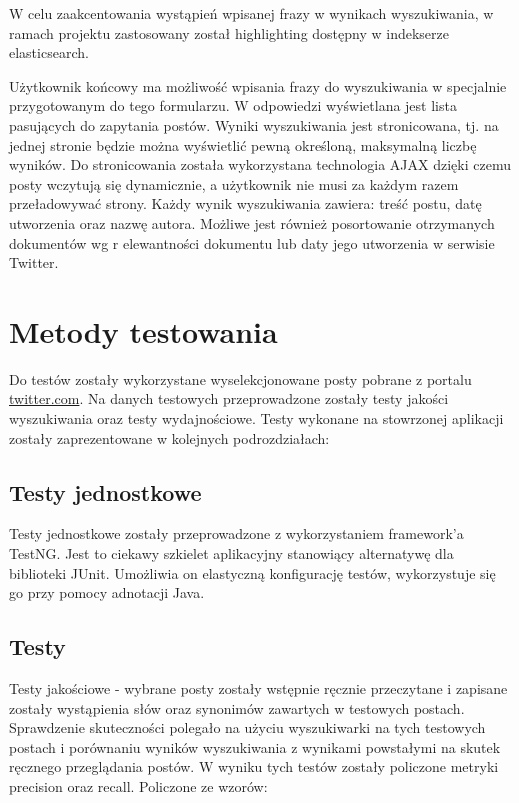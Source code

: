 \documentclass[runningheads]{llncs}
\begin{document}
W celu zaakcentowania wystąpień wpisanej frazy w wynikach wyszukiwania,  w
ramach projektu zastosowany został highlighting dostępny w indekserze
elasticsearch.

Użytkownik końcowy ma możliwość wpisania frazy do wyszukiwania w
specjalnie przygotowanym do tego formularzu. W odpowiedzi wyświetlana jest lista
pasujących do zapytania postów. Wyniki wyszukiwania jest stronicowana, tj.
na jednej stronie będzie można wyświetlić pewną określoną,  maksymalną liczbę
wyników. Do stronicowania została wykorzystana technologia AJAX dzięki czemu
posty wczytują się dynamicznie, a użytkownik nie musi za każdym razem
przeładowywać strony. Każdy wynik wyszukiwania zawiera:
treść postu, datę utworzenia oraz nazwę autora.  Możliwe jest również
posortowanie otrzymanych dokumentów wg r elewantności dokumentu lub daty jego
utworzenia w serwisie Twitter.

\section{Metody testowania}
\label{sec:metody-testowania}

Do testów zostały wykorzystane wyselekcjonowane posty pobrane z portalu
\url{twitter.com}.
Na danych testowych przeprowadzone zostały testy jakości wyszukiwania oraz testy
wydajnościowe. Testy wykonane na stowrzonej aplikacji zostały zaprezentowane w
kolejnych podrozdziałach:
\subsection{Testy jednostkowe}
Testy jednostkowe zostały przeprowadzone z wykorzystaniem framework’a TestNG.
Jest to ciekawy szkielet aplikacyjny stanowiący alternatywę dla biblioteki
JUnit. Umożliwia on elastyczną konfigurację testów, wykorzystuje się go przy
pomocy adnotacji Java.
 
\subsection{Testy}
 Testy jakościowe - wybrane posty zostały wstępnie ręcznie przeczytane i 
  zapisane zostały wystąpienia słów oraz synonimów zawartych w testowych
  postach.
	Sprawdzenie skuteczności polegało na użyciu wyszukiwarki na  tych testowych
	postach i porównaniu wyników wyszukiwania z wynikami powstałymi  na skutek
	ręcznego przeglądania postów. W wyniku tych testów zostały policzone  metryki
	precision oraz  recall. Policzone ze wzorów:
  
\end{document}
